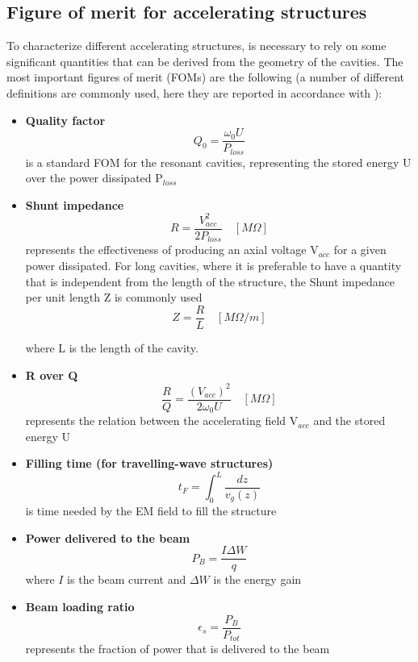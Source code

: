 \subsection[Figure of merit for accelerating structures]{Figure of merit for accelerating structures}

To characterize different accelerating structures, is necessary to rely on some significant quantities that can be derived from the geometry of the cavities. The most important figures of merit (FOMs) are the following (a number of different definitions are commonly used, here they are reported in accordance with \cite{TECKER:RFCAS}):
\begin{itemize}

\item \textbf{Quality factor} 
\begin{equation}
Q_0 = \frac{\omega_0 U}{P_{loss}} 
\end{equation}
is a standard FOM for the resonant cavities, representing the stored energy U over the power dissipated P$_{loss}$

\item \textbf{Shunt impedance} 
\begin{equation}
R = \frac{V_{acc}^2}{2P_{loss}}  \quad [M\Omega]
\end{equation}
represents the effectiveness of producing an axial voltage V$_{acc}$ for a given power dissipated. For long cavities, where it is preferable to have a quantity that is independent from the length of the structure, the Shunt impedance per unit length
 Z is commonly used 
\begin{equation}
Z = \frac{R}{L}  \quad [M\Omega / m]
\end{equation}

where L is the length of the cavity.

\item \textbf{R over Q} 
\begin{equation}
\frac{R}{Q} = \frac{(V_{acc})^2}{2\omega_0 U}  \quad [M\Omega]
\end{equation}
represents the relation between the accelerating field V$_{acc}$ and the stored energy U


\item \textbf{Filling time (for travelling-wave structures)}
\begin{equation}
t_F = \int_0^L \frac{dz}{v_g (z)}
\end{equation}
is time needed by the EM field to fill the structure

\item \textbf{Power delivered to the beam}
\begin{equation}
P_B = \frac{I \Delta W}{q}
\end{equation}
where $I$ is the beam current and $\Delta W$ is the energy gain

\item \textbf{Beam loading ratio}
\begin{equation}
\epsilon_s = \frac{P_B}{P_{tot}}
\end{equation}
represents the fraction of power that is delivered to the beam

\end{itemize}


